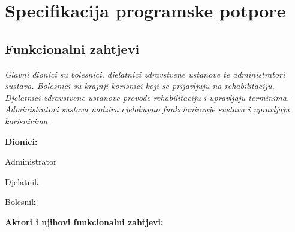 
\chapter{Specifikacija programske potpore}

\section{Funkcionalni zahtjevi}


\newcommand{\usecase}[1]{
  \refstepcounter{UCCounter} %
  \noindent\underbar{\textbf{UC\theUCCounter{} - #1}} %
  \begin{packed_item}
}

\newcommand{\closeusecase}{
  \end{packed_item}
  \vspace{1em}
}


\textit{ Glavni dionici su bolesnici, djelatnici zdravstvene ustanove te administratori sustava. Bolesnici su krajnji korisnici koji se prijavljuju na rehabilitaciju. Djelatnici zdravstvene ustanove provode rehabilitaciju i upravljaju terminima. Administratori sustava nadziru cjelokupno funkcioniranje sustava i upravljaju korisnicima.}


\noindent \textbf{Dionici:}

\begin{packed_enum}

	\item Administrator
	\item Djelatnik
	\item Bolesnik

\end{packed_enum}

\noindent \textbf{Aktori i njihovi funkcionalni zahtjevi:}


